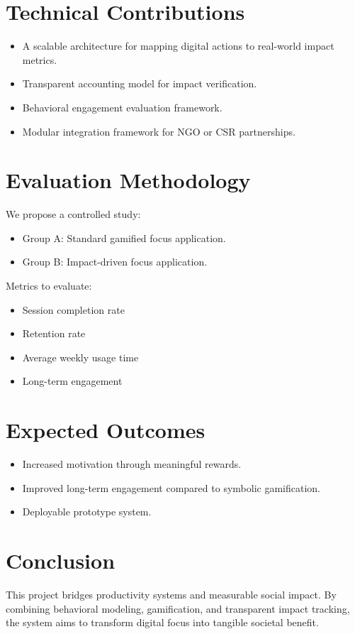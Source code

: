 \documentclass[12pt]{article}
\begin{document}
\section{Technical Contributions}

\begin{itemize}
    \item A scalable architecture for mapping digital actions to real-world impact metrics.
    \item Transparent accounting model for impact verification.
    \item Behavioral engagement evaluation framework.
    \item Modular integration framework for NGO or CSR partnerships.
\end{itemize}

\section{Evaluation Methodology}

We propose a controlled study:

\begin{itemize}
    \item Group A: Standard gamified focus application.
    \item Group B: Impact-driven focus application.
\end{itemize}

Metrics to evaluate:
\begin{itemize}
    \item Session completion rate
    \item Retention rate
    \item Average weekly usage time
    \item Long-term engagement
\end{itemize}

\section{Expected Outcomes}

\begin{itemize}
    \item Increased motivation through meaningful rewards.
    \item Improved long-term engagement compared to symbolic gamification.
    \item Deployable prototype system.
\end{itemize}

\section{Conclusion}

This project bridges productivity systems and measurable social impact. 
By combining behavioral modeling, gamification, and transparent impact tracking, 
the system aims to transform digital focus into tangible societal benefit.
\end{document}

